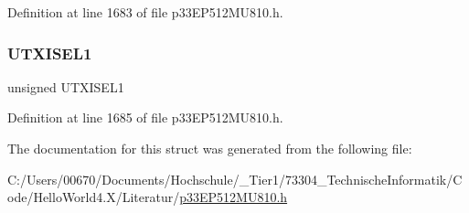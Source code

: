 Definition at line 1683 of file p33\+E\+P512\+M\+U810.\+h.

\mbox{\label{structtag_u1_s_t_a_b_i_t_s_af7ce0d24148cffc8fc3d8abccf37ea9f}} 
\subsubsection{\texorpdfstring{U\+T\+X\+I\+S\+E\+L1}{UTXISEL1}}
{\footnotesize\ttfamily unsigned U\+T\+X\+I\+S\+E\+L1}



Definition at line 1685 of file p33\+E\+P512\+M\+U810.\+h.



The documentation for this struct was generated from the following file\+:\begin{DoxyCompactItemize}
\item 
C\+:/\+Users/00670/\+Documents/\+Hochschule/\+\_\+\+Tier1/73304\+\_\+\+Technische\+Informatik/\+Code/\+Hello\+World4.\+X/\+Literatur/\hyperlink{p33_e_p512_m_u810_8h}{p33\+E\+P512\+M\+U810.\+h}\end{DoxyCompactItemize}
